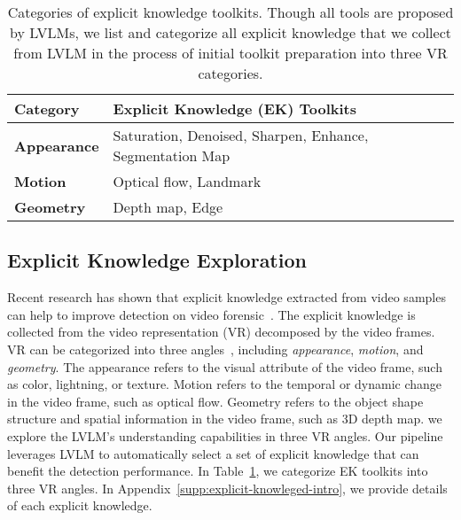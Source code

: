 \begin{table}[t]
\centering
\scriptsize
\setlength{\tabcolsep}{2pt} %
\begin{tabular}{l|l}
\toprule
\textbf{Category}   & \textbf{Explicit Knowledge (EK) Toolkits}                     \\ \midrule
\textbf{Appearance} & Saturation, Denoised,  Sharpen, Enhance, Segmentation Map \\
\textbf{Motion}     & Optical flow, Landmark                                        \\
\textbf{Geometry}   & Depth map, Edge                                               \\ \bottomrule
\end{tabular}
\vspace{-2mm}
\caption{Categories of explicit knowledge toolkits. Though all tools are proposed by LVLMs, we list and categorize all explicit knowledge  that we collect from LVLM in the process of initial toolkit preparation into three VR categories.}
\label{tab:ek_category}
\vspace{-2mm}
\end{table}

\subsection{Explicit Knowledge Exploration}
Recent research has shown that explicit knowledge extracted from video samples can help to improve detection on video forensic~\cite{chang2024mattersaigeneratedvideos}. The explicit knowledge is collected from the video representation (VR) decomposed by the video frames. VR can be categorized into three angles~\cite{chang2024mattersdetectingaigeneratedvideos}, including \textit{appearance}, \textit{motion}, and \textit{geometry}. The appearance refers to the visual attribute of the video frame, such as color, lightning, or texture. Motion refers to the temporal or dynamic change in the video frame, such as optical flow. Geometry refers to the object shape structure and spatial information in the video frame, such as 3D depth map. we explore the LVLM's understanding capabilities in three VR angles. Our pipeline leverages LVLM to automatically select a set of explicit knowledge that can benefit the detection performance.
In Table~\ref{tab:ek_category}, we categorize EK toolkits into three VR angles.
In Appendix~\ref{supp:explicit-knowleged-intro}, we provide details of each explicit knowledge.


